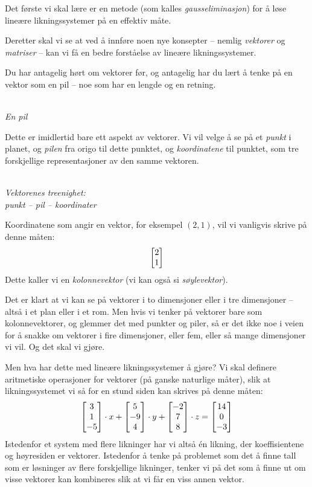 \smallskip
Det første vi skal lære er en metode (som kalles
\emph{gausseliminasjon}) for å løse lineære likningssystemer på en
effektiv måte.

Deretter skal vi se at ved å innføre noen nye konsepter -- nemlig
\emph{vektorer} og \emph{matriser} -- kan vi få en bedre forståelse av
lineære likningssystemer.

Du har antagelig hørt om vektorer før, og antagelig har du lært å
tenke på en vektor som en pil -- noe som har en lengde og en retning.
\begin{center}
\\
{\small \textit{En pil}}
\end{center}
Dette er imidlertid bare ett aspekt av vektorer.  Vi vil velge å se på
et \emph{punkt} i planet, og \emph{pilen} fra origo til dette punktet, og
\emph{koordinatene} til punktet, som tre forskjellige representasjoner
av den samme vektoren.
\begin{center}
\\
{\small \textit{Vektorenes treenighet:\\punkt -- pil -- koordinater}}
\end{center}
Koordinatene som angir en vektor, for eksempel $(2,1)$, vil vi
vanligvis skrive på denne måten:
\[
\begin{bmatrix} 2 \\ 1 \end{bmatrix}
\]
Dette kaller vi en \emph{kolonnevektor} (vi kan også si
\emph{søylevektor}).

Det er klart at vi kan se på vektorer i to dimensjoner eller i tre
dimensjoner -- altså i et plan eller i et rom.  Men hvis vi tenker på
vektorer bare som kolonnevektorer, og glemmer det med punkter og
piler, så er det ikke noe i veien for å snakke om vektorer i fire
dimensjoner, eller fem, eller så mange dimensjoner vi vil.  Og det
skal vi gjøre.

Men hva har dette med lineære likningssystemer å gjøre?  Vi skal
definere aritmetiske operasjoner for vektorer (på ganske naturlige
måter), slik at likningssystemet vi så for en stund siden kan skrives
på denne måten:
\[
\begin{bmatrix} 3 \\ 1 \\ -5 \end{bmatrix} \cdot x + \begin{bmatrix} 5 \\ -9 \\ 4 \end{bmatrix} \cdot y + \begin{bmatrix} -2 \\ 7 \\ 8 \end{bmatrix} \cdot z = \begin{bmatrix} 14 \\ 0 \\ -3 \end{bmatrix}
\]
Istedenfor et system med flere likninger har vi altså én likning, der
koeffisientene og høyresiden er vektorer.  Istedenfor å tenke på
problemet som det å finne tall som er løsninger av flere forskjellige
likninger, tenker vi på det som å finne ut om visse vektorer kan
kombineres slik at vi får en viss annen vektor.

